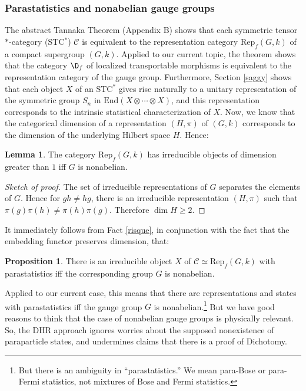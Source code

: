 \documentclass[12pt]{article}
\theoremstyle{definition}
\newtheorem{prop}[thm]{Proposition}
\newtheorem{lemma}[thm]{Lemma}
\theoremstyle{definition}
\theoremstyle{remark}
\def\2#1{{\mathcal #1}}
\newcommand{\End}{\mathrm{End}}
\newcommand{\Rep}{\mathrm{Rep}}
\begin{document}
\subsubsection{Parastatistics and nonabelian gauge groups}

The abstract Tannaka Theorem (Appendix B) shows that
each symmetric tensor $*$-category (STC$^*$) $\2C$ is
equivalent to the representation category $\Rep
_f(G,k)$ of a compact supergroup $(G,k)$.  Applied to
our current topic, the theorem shows that the category
$\D _f$ of localized transportable morphisms is
equivalent to the representation category of the gauge
group.  Furthermore, Section \ref{saggy} shows that
each object $X$ of an STC$^*$ gives rise naturally to a
unitary representation of the symmetric group $S_n$ in
$\End (X\otimes \cdots \otimes X)$, and this
representation corresponds to the intrinsic statistical
characterization of $X$.  Now, we know that the
categorical dimension of a representation $(H,\pi )$ of
$(G,k)$ corresponds to the dimension of the underlying
Hilbert space $H$.  Hence:

\begin{lemma} The category $\Rep _f(G,k)$ has irreducible objects of
  dimension greater than $1$ iff $G$ is nonabelian.  \end{lemma}

\begin{proof}[Sketch of proof] The set of irreducible representations
  of $G$ separates the elements of $G$.  Hence for $gh\neq hg$, there
  is an irreducible representation $(H,\pi )$ such that $\pi (g)\pi
  (h)\neq \pi (h)\pi (g)$.  Therefore $\dim H\geq 2$.  \end{proof}
\noindent It immediately follows from Fact \ref{risque}, in
conjunction with the fact that the embedding functor preserves
dimension, that:

\begin{prop} There is an irreducible object $X$ of $\2C \simeq \Rep
  _f(G,k)$ with parastatistics iff the corresponding group $G$ is nonabelian.
\end{prop}

Applied to our current case, this means that there are representations
and states with parastatistics iff the gauge group $G$ is
nonabelian.\footnote{But there is an ambiguity in ``parastatistics.''
  We mean para-Bose or para-Fermi statistics, not mixtures of Bose and
  Fermi statistics.}  But we have good reasons to think that the case
of nonabelian gauge groups is physically relevant.  So, the DHR
approach ignores worries about the supposed nonexistence of
paraparticle states, and undermines claims that there is a proof of
Dichotomy.
\end{document}
